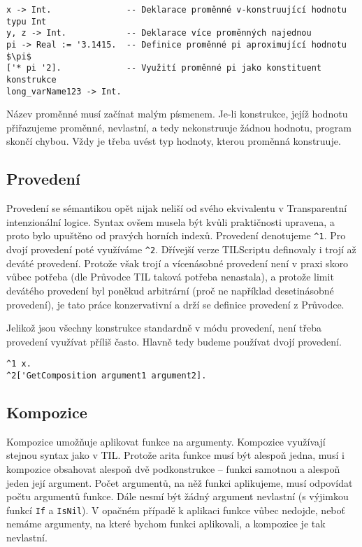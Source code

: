 \begin{lstlisting}[caption={Příklad využití proměnných}]
x -> Int.               -- Deklarace proměnné v-konstruující hodnotu typu Int
y, z -> Int.            -- Deklarace více proměnných najednou
pi -> Real := '3.1415.  -- Definice proměnné pi aproximující hodnotu $\pi$
['* pi '2].             -- Využití proměnné pi jako konstituent konstrukce
long_varName123 -> Int.
\end{lstlisting}

Název proměnné musí začínat malým písmenem. Je-li konstrukce, jejíž hodnotu přiřazujeme proměnné,
nevlastní, a tedy nekonstruuje žádnou hodnotu, program skončí chybou. Vždy je třeba uvést typ
hodnoty, kterou proměnná konstruuje.

\subsection{Provedení}

Provedení se sémantikou opět nijak neliší od svého ekvivalentu v Transparentní intenzionální logice.
Syntax ovšem musela být kvůli praktičnosti upravena, a proto bylo upuštěno od pravých horních
indexů. Provedení denotujeme \lstinline{^1}. Pro dvojí provedení poté využíváme \lstinline{^2}.
Dřívejší verze TILScriptu definovaly i trojí až deváté provedení. Protože však trojí a vícenásobné
provedení není v praxi skoro vůbec potřeba (dle Průvodce TIL taková potřeba nenastala), a protože
limit devátého provedení byl poněkud arbitrární (proč ne například desetinásobné provedení), je
tato práce konzervativní a drží se definice provedení z Průvodce.

Jelikož jsou všechny konstrukce standardně v módu provedení, není třeba provedení využívat příliš
často. Hlavně tedy budeme používat dvojí provedení.

\begin{lstlisting}[caption={Příklad využití provedení}]
^1 x.
^2['GetComposition argument1 argument2].
\end{lstlisting}

\subsection{Kompozice}

Kompozice umožňuje aplikovat funkce na argumenty. Kompozice využívají stejnou syntax jako v TIL.
Protože arita funkce musí být alespoň jedna, musí i kompozice obsahovat alespoň dvě podkonstrukce
-- funkci samotnou a alespoň jeden její argument. Počet argumentů, na něž funkci aplikujeme, musí
odpovídat počtu argumentů funkce. Dále nesmí být žádný argument nevlastní (s výjimkou funkcí
\lstinline{If} a \lstinline{IsNil}). V opačném případě k aplikaci funkce vůbec nedojde, neboť
nemáme argumenty, na které bychom funkci aplikovali, a kompozice je tak nevlastní.

